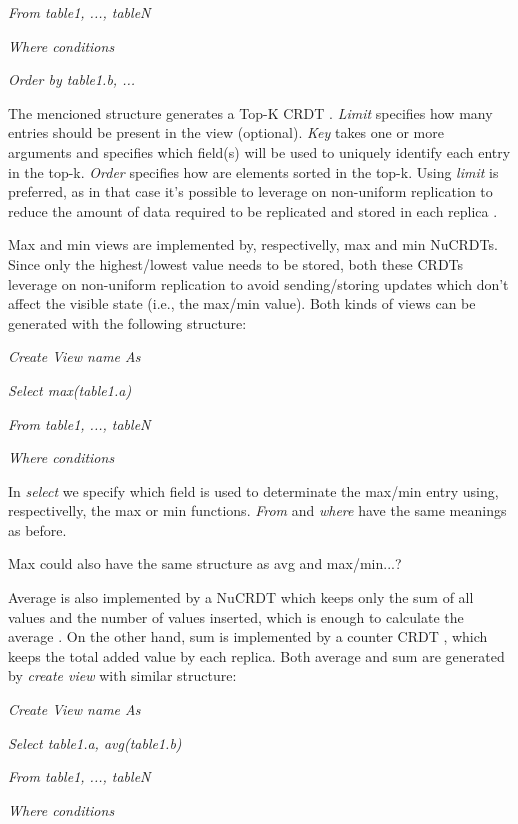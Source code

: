 \documentclass{vldb}
\newcommand{\grumbler}[2]{{\color{red}{\bf #1:} #2}}
\newcommand{\andre}[1]{\grumbler{andre}{#1}}
\newcommand{\emphvspace}{0.5\baselineskip}
\newcommand{\firstblockemph}[1]{\vspace{\emphvspace}\hspace{2em}\emph{#1}}
\newcommand{\middleblockemph}[1]{\hspace{2em}\emph{#1}}
\newcommand{\lastblockemph}[1]{\hspace{2em}\emph{#1}\vspace{\emphvspace}}
\begin{document}
\middleblockemph{From table1, ..., tableN}

\middleblockemph{Where conditions}

\lastblockemph{Order by table1.b, ...}

The mencioned structure generates a Top-K CRDT \cite{???}.
\emph{Limit} specifies how many entries should be present in the view (optional). \emph{Key} takes one or more arguments and specifies which field(s) will be used to uniquely identify each entry in the top-k.
\emph{Order} specifies how are elements sorted in the top-k.
Using \emph{limit} is preferred, as in that case it's possible to leverage on non-uniform replication to reduce the amount of data required to be replicated and stored in each replica \cite{???}.

Max and min views are implemented by, respectivelly, max and min NuCRDTs.
Since only the highest/lowest value needs to be stored, both these CRDTs leverage on non-uniform replication to avoid sending/storing updates which don't affect the visible state (i.e., the max/min value).
Both kinds of views can be generated with the following structure:

\firstblockemph{Create View name As}

\middleblockemph{Select max(table1.a)}

\middleblockemph{From table1, ..., tableN}

\lastblockemph{Where conditions}

In \emph{select} we specify which field is used to determinate the max/min entry using, respectivelly, the max or min functions.
\emph{From} and \emph{where} have the same meanings as before.

\andre{Max could also have the same structure as avg and max/min...?}

Average is also implemented by a NuCRDT which keeps only the sum of all values and the number of values inserted, which is enough to calculate the average \cite{???}.
On the other hand, sum is implemented by a counter CRDT \cite{???}, which keeps the total added value by each replica.
Both average and sum are generated by \emph{create view} with similar structure:

\firstblockemph{Create View name As}

\middleblockemph{Select table1.a, avg(table1.b)}

\middleblockemph{From table1, ..., tableN}

\middleblockemph{Where conditions}
\end{document}
